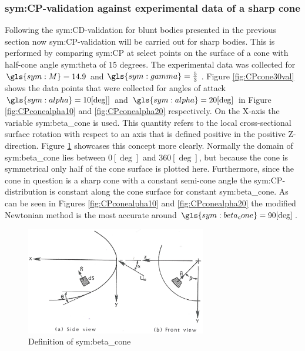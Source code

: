 \subsubsection{\gls{sym:CP}-validation against experimental data of a sharp cone}
\label{subsubsec:valsharpconeCP}
Following the \gls{sym:CD}-validation for blunt bodies presented in the previous section now \gls{sym:CP}-validation will be carried out for sharp bodies. This is performed by comparing \gls{sym:CP} at select points on the surface of a cone with half-cone angle \gls{sym:theta} of $15$ degrees. The experimental data was collected for $\gls{sym:M}=14.9$ and $\gls{sym:gamma}=\frac{5}{3}$  \cite{Bertin1994,Cleary1970}. Figure \ref{fig:CPcone30val} shows the data points that were collected for angles of attack $\gls{sym:alpha}=10[\deg]]$ and $\gls{sym:alpha}=20[\deg]$ in Figure \ref{fig:CPconealpha10} and \ref{fig:CPconealpha20} respectively. On the X-axis the variable \gls{sym:beta_cone} is used. This quantity refers to the local cross-sectional surface rotation with respect to an axis that is defined positive in the positive Z-direction. Figure \ref{fig:beta_cone} showcases this concept more clearly. Normally the domain of \gls{sym:beta_cone} lies between $0[\deg]$ and $360[\deg]$, but because the cone is symmetrical only half of the cone surface is plotted here. Furthermore, since the cone in question is a sharp cone with a constant semi-cone angle the \gls{sym:CP}-distribution is constant along the cone surface for constant \gls{sym:beta_cone}.
As can be seen in Figures \ref{fig:CPconealpha10} and \ref{fig:CPconealpha20} the modified Newtonian method is the most accurate around $\gls{sym:beta_cone}=90[\deg]$.

\begin{figure}[h]
	\centering
	\includegraphics[width=0.7\textwidth]{./Figure/def_beta}
	\caption{Definition of \gls{sym:beta_cone} \cite{Bertin1994}}
	\label{fig:beta_cone}
\end{figure}

